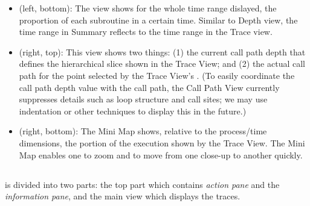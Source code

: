 \begin{itemize}
\item \textbf{\summaryview} (left, bottom):
  The view shows for the whole time range dislayed, the proportion of each subroutine in a certain time.
  Similar to Depth view, the time range in Summary reflects to the time range in the Trace view. 

\item \textbf{\callview} (right, top):
  This view shows two things: (1) the current call path depth that defines the hierarchical slice shown in the Trace View; and (2) the actual call path for the point selected by the Trace View's \crosshair{}.
  (To easily coordinate the call path depth value with the call path, the Call Path View currently suppresses details such as loop structure and call sites; we may use indentation or other techniques to display this in the future.)

\item \textbf{\miniview} (right, bottom):
  The Mini Map shows, relative to the process/time dimensions, the portion of the execution shown by the Trace View.
  The Mini Map enables one to zoom and to move from one close-up to another quickly.

\end{itemize}


\subsection{\traceview}
\label{sec:traceview}

\traceview{} is divided into two parts: the top part which contains \emph{action pane} and the \emph{information pane}, and the main view which displays the traces. 


